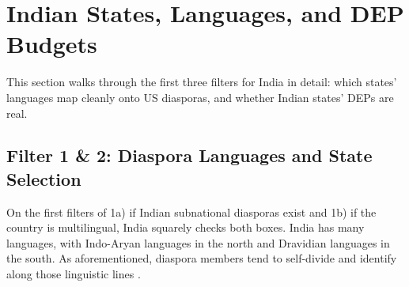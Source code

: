 \documentclass[12pt]{article}
\let\oldsection\section
\renewcommand{\section}{\FloatBarrier\oldsection}
\let\oldsubsection\subsection
\renewcommand{\subsection}{\FloatBarrier\oldsubsection}
\begin{document}
\section{Indian States, Languages, and DEP Budgets} \label{sec:oa_states}

This section walks through the first three filters for India in detail: which states' languages map cleanly onto US diasporas, and whether Indian states' DEPs are real.


\subsection{Filter 1 \& 2: Diaspora Languages and State Selection} \label{ss:diaspora languages, state selection}
On the first filters of 1a) if Indian subnational diasporas exist and 1b) if the country is multilingual, India squarely checks both boxes. India has many languages, with Indo-Aryan languages in the north and Dravidian languages in the south. As aforementioned, diaspora members tend to self-divide and identify along those linguistic lines \citep{sahoo_issues_2006, gautam_indian_2013}. 
\end{document}
